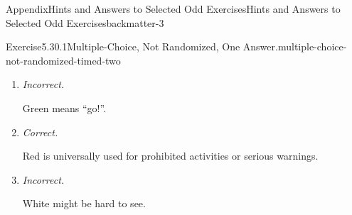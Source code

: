 \documentclass[oneside,10pt,]{book}
\newcommand{\lititle}[1]{{\slshape#1}}
\numberwithin{equation}{section}
\begin{document}
\begin{solutions-chapter}{Appendix}{Hints and Answers to Selected Odd Exercises}{}{Hints and Answers to Selected Odd Exercises}{}{}{backmatter-3}
\begin{divisionsolution}{Exercise}{5.30.1}{Multiple-Choice, Not Randomized, One Answer.}{multiple-choice-not-randomized-timed-two}
\begin{enumerate}[label={\Alph*.}]
\item{}\lititle{Incorrect.}\par%
Green means ``go!''.%
\item{}\lititle{Correct.}\par%
Red is universally used for prohibited activities or serious warnings.%
\item{}\lititle{Incorrect.}\par%
White might be hard to see.%
\end{enumerate}
%
\end{divisionsolution}%
\end{solutions-chapter}
%
%
\typeout{************************************************}
\typeout{************************************************}
%
\end{document}
